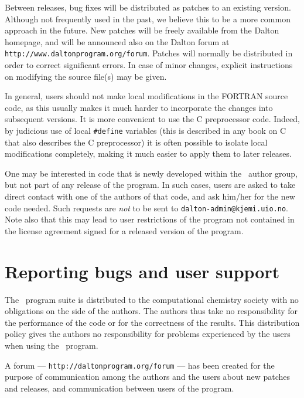 Between releases, bug fixes will be distributed as
patches to an
existing version. Although not frequently used in the past, we believe
this to be a more common approach in the future. New patches will be
freely available from the 
Dalton homepage, and will be announced also on the Dalton forum at \verb|http://www.daltonprogram.org/forum|.
Patches will normally be distributed in order to correct
significant errors. In case of minor changes, explicit
instructions on modifying the source file(s) may be given.

In general, users should not make local
modifications in the FORTRAN source code, as this usually makes it
much harder to incorporate the changes into subsequent versions.
It is more convenient to use the C preprocessor code.  Indeed, by
judicious use of local \verb|#define| variables (this
is described in any book on C that also describes the C
preprocessor) it is often possible to isolate local
modifications completely, making it much easier
to apply them to later
releases.

One may be interested in code that is newly developed within the
\dalton\ author group, but not part of any release of the program. In
such cases, users are asked to take direct contact with one of the
authors of that code, and ask him/her for the new code
needed. Such requests are {\em not} to be sent to
\verb|dalton-admin@kjemi.uio.no|. Note also that this may lead to user
restrictions of the program not contained in the license agreement
signed for a released version of the program.

\section{Reporting bugs and user support}

The \latestrelease\ program suite is distributed to the computational chemistry
society with no obligations on the side of the
authors. The authors thus take no responsibility
for the performance
of the code or for the correctness of the
results. This distribution
policy gives the authors no responsibility for problems experienced by
the users when using the \dalton\ program.

A forum ---
\verb|http://daltonprogram.org/forum| --- has been created for
the purpose of communication among the authors and the users about
new patches and releases, and communication between users of the
program.

